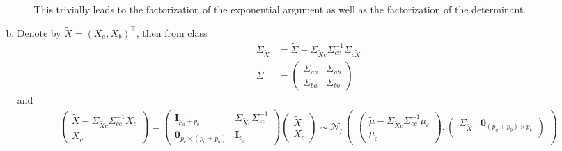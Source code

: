 \documentclass[10pt,notitlepage]{article}
\newcommand{\Id}{\mathbf{I}}
\newcommand{\ZeroM}{\mathbf{0}}
\begin{document}
\begin{exercise}[Solution]
\begin{enumerate}[(a)]
\begin{itemize}
                                This trivially leads to the factorization of the exponential argument as well as the factorization of the determinant.
                    \end{itemize}
            \item Denote by $\tilde{X} = \left(X_a, X_b\right)^\top$, then from class
                    \begin{align*}
                        \Sigma_{\tilde{X}} &= \tilde{\Sigma} - \Sigma_{\tilde{X}c}\Sigma_{cc}^{-1}\Sigma_{c\tilde{X}}\\
                        \tilde{\Sigma} &= 
                        \begin{pmatrix}
                            \Sigma_{aa} & \Sigma_{ab}\\
                            \Sigma_{ba} & \Sigma_{bb}
                        \end{pmatrix}
                    \end{align*}
                    and
                    \begin{align*}
                        \begin{pmatrix}
                            \tilde{X} - \Sigma_{\tilde{X}c}\Sigma_{cc}^{-1}X_c\\
                            X_c
                        \end{pmatrix} =
                        \begin{pmatrix}
                            \Id_{p_a+p_b} & \Sigma_{\tilde{X}c}\Sigma_{cc}^{-1}\\
                            \ZeroM_{p_c\times(p_a+p_b)} & \Id_{p_c}
                        \end{pmatrix}
                        \begin{pmatrix}
                            \tilde{X}\\
                            X_c
                        \end{pmatrix}
                        \sim\mathcal{N}_p
                        \begin{pmatrix}
                            \begin{pmatrix}
                                \tilde{\mu} - \Sigma_{\tilde{X}c}\Sigma_{cc}^{-1}\mu_c\\
                                \mu_c
                            \end{pmatrix},
                            \begin{pmatrix}
                                \Sigma_{\tilde{X}} & \ZeroM_{(p_a+p_b)\times p_c}\\

\end{pmatrix}
\end{pmatrix}
\end{align*}
\end{enumerate}
\end{exercise}
\end{document}
